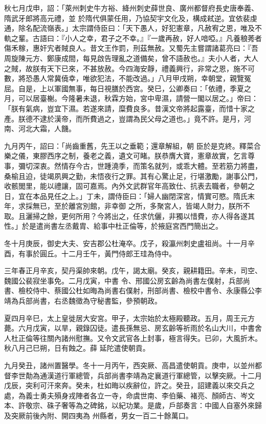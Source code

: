 \begin{pinyinscope}
 秋七月戊申，詔：「萊州刺史牛方裕、絳州刺史薛世良、廣州都督府長史唐奉義、隋武牙郎將高元禮，並
 於隋代俱蒙任用，乃協契宇文化及，構成弒逆。宜依裴虔通，除名配流嶺表。」太宗謂侍臣曰：「天下愚人，好犯憲章，凡赦宥之恩，唯及不軌之輩。古語曰：『小人之幸，君子之不幸。』『一歲再赦，好人喑啞。』凡養稂莠者傷禾稼，惠奸宄者賊良人。昔文王作罰，刑茲無赦。又蜀先主嘗謂諸葛亮曰：『吾周旋陳元方、鄭康成間，每見啟告理亂之道備矣，曾不語赦也。』夫小人者，大人之賊，故朕有天下已來，不甚放赦。今四海安靜，禮義興行，非常之恩，施不可
 數，將恐愚人常冀僥幸，唯欲犯法，不能改過。」八月甲戌朔，幸朝堂，親覽冤屈。自是，上以軍國無事，每日視膳於西宮。癸巳，公卿奏曰：「依禮，季夏之月，可以居臺榭。今隆暑未退，秋霖方始，宮中卑濕，請營一閣以居之。」帝曰：「朕有氣病，豈宜下濕。若遂來請，糜費良多。昔漢文帝將起露臺，而惜十家之產。朕德不逮於漢帝，而所費過之，豈謂為民父母之道也。」竟不許。是月，河南、河北大霜，人饑。



 九月丙午，詔曰：「尚齒重舊，先王以之垂範；還章解組，朝
 臣於是克終。釋菜合樂之儀，東膠西序之制，養老之義，遺文可睹。朕恭膺大寶，憲章故實，乞言尊事，彌切深衷。然情存今古，世踵澆季，而策名就列，或乖大體。至若筋力將盡，桑榆且迫，徒竭夙興之勤，未悟夜行之罪。其有心驚止足，行堪激勵，謝事公門，收骸閭里，能以禮讓，固可嘉焉。內外文武群官年高致仕、抗表去職者，參朝之日，宜在本品見任之上。」丁未，謂侍臣曰：「婦人幽閉深宮，情實可愍。隋氏末年，求採無已，至於離宮別館，非幸御
 之所，多聚宮人，皆竭人財力，朕所不取。且灑掃之餘，更何所用？今將出之，任求伉儷，非獨以惜費，亦人得各遂其性。」於是遣尚書左丞戴胄、給事中杜正倫等，於掖庭宮西門簡出之。



 冬十月庚辰，御史大夫、安吉郡公杜淹卒。戊子，殺瀛州刺史盧祖尚。十一月辛酉，有事於圓丘。十二月壬午，黃門侍郎王珪為侍中。



 三年春正月辛亥，契丹渠帥來朝。戊午，謁太廟。癸亥，親耕籍田。辛未，司空、魏國公裴寂坐事免。二月戊寅，中書
 令、邢國公房玄齡為尚書左僕射，兵部尚書、檢校侍中、蔡國公杜如晦為尚書右僕射，刑部尚書、檢校中書令、永康縣公李靖為兵部尚書，右丞魏徵為守秘書監，參預朝政。



 夏四月辛巳，太上皇徙居大安宮。甲子，太宗始於太極殿聽政。五月，周王元方薨。六月戊寅，以旱，親錄囚徒。遣長孫無忌、房玄齡等祈雨於名山大川，中書舍人杜正倫等往關內諸州慰撫。又令文武官各上封事，極言得失。已卯，大風折木。秋八月己巳朔，日有蝕之。薛
 延陀遣使朝貢。



 九月癸丑，諸州置醫學。冬十一月丙午，西突厥、高昌遣使朝貢。庚申，以並州都督李世勣為通漢道行軍總管，兵部尚書李靖為定襄道行軍總管，以擊突厥。十二月戊辰，突利可汗來奔。癸未，杜如晦以疾辭位，許之。癸丑，詔建義以來交兵之處，為義士勇夫殞身戎陣者各立一寺，命虞世南、李伯藥、褚亮、顏師古、岑文本、許敬宗、硃子奢等為之碑銘，以紀功業。是歲，戶部奏言：中國人自塞外來歸及突厥前後內附、開四夷為
 州縣者，男女一百二十餘萬口。



\end{pinyinscope}